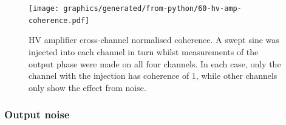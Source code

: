 \begin{figure}
  \centering
  \texttt{[image: graphics/generated/from-python/60-hv-amp-coherence.pdf]}
  \caption[High voltage amplifier cross-channel coherence]{\gls{HV} amplifier cross-channel normalised coherence. A swept sine was injected into each channel in turn whilst measurements of the output phase were made on all four channels. In each case, only the channel with the injection has coherence of \num{1}, while other channels only show the effect from noise.}
  \label{fig:hv-amp-coherence}
\end{figure}

\subsubsection{Output noise}

